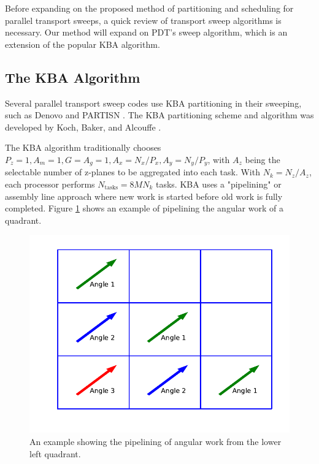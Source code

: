 \documentclass[11pt, letterpaper,titlepage,oneside]{article}
\begin{document}
Before expanding on the proposed method of partitioning and scheduling for parallel transport sweeps, a quick review of transport sweep algorithms is necessary. Our method will expand on PDT's sweep algorithm\cite{mpadams2013}, which is an extension of the popular KBA algorithm\cite{KBA}.

\subsection{The KBA Algorithm}

Several parallel transport sweep codes use KBA partitioning in their sweeping, such as Denovo \cite{denovo} and PARTISN \cite{partisn}. The KBA partitioning scheme and algorithm was developed by Koch, Baker, and Alcouffe \cite{KBA}.

The KBA algorithm traditionally chooses $P_z = 1, A_m = 1, G = A_g = 1, A_x = N_x/P_x, A_y = N_y/P_y$, with $A_z$ being the selectable number of z-planes to be aggregated into each task. With $N_k = N_z/A_z$, each processor performs $N_{\text{tasks}} = 8MN_k$ tasks. KBA uses a "pipelining" or assembly line approach where new work is started before old work is fully completed. Figure \ref{pipeline_example} shows an example of pipelining the angular work of a quadrant.

\begin{figure}[H]
\centering
\includegraphics[scale=0.75,trim={0cm 1cm 0cm 0cm},clip]{../figures/pipeline_example.pdf}
\caption{An example showing the pipelining of angular work from the lower left quadrant.}
\label{pipeline_example}
\end{figure}
\end{document}
